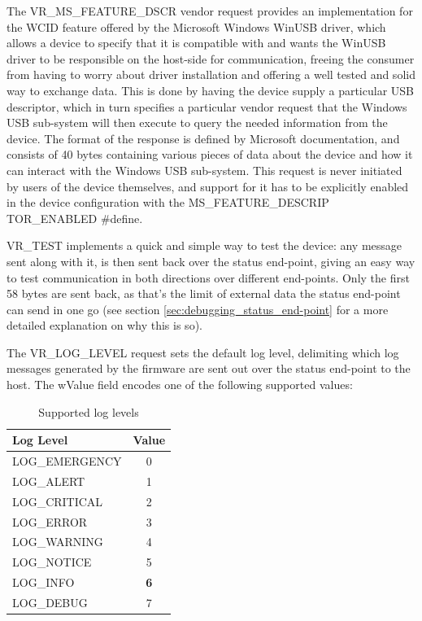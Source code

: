 \documentclass[a4paper,12pt]{report}
\begin{document}
The VR\_MS\_FEATURE\_DSCR vendor request provides an implementation for the WCID feature offered by the Microsoft Windows WinUSB driver, which allows a device to specify that it is compatible with and wants the WinUSB driver to be responsible on the host-side for communication, freeing the consumer from having to worry about driver installation and offering a well tested and solid way to exchange data. This is done by having the device supply a particular USB descriptor, which in turn specifies a particular vendor request that the Windows USB sub-system will then execute to query the needed information from the device. The format of the response is defined by Microsoft documentation, and consists of 40 bytes containing various pieces of data about the device and how it can interact with the Windows USB sub-system. This request is never initiated by users of the device themselves, and support for it has to be explicitly enabled in the device configuration with the MS\_FEATURE\_DESCRIP
 TOR\_ENABLED \#define.

VR\_TEST implements a quick and simple way to test the device: any message sent along with it, is then sent back over the status end-point, giving an easy way to test communication in both directions over different end-points. Only the first 58 bytes are sent back, as that's the limit of external data the status end-point can send in one go (see section \ref{sec:debugging_status_end-point} for a more detailed explanation on why this is so).

The VR\_LOG\_LEVEL request sets the default log level, delimiting which log messages generated by the firmware are sent out over the status end-point to the host. The wValue field encodes one of the following supported values:

\begin{table}[H]
\begin{center}
\caption{Supported log levels}
\label{tab:log_levels}
\begin{tabu} to \linewidth {|l|c|}
\hline
Log Level & Value \\ \hline
LOG\_EMERGENCY & 0 \\ \hline
LOG\_ALERT & 1 \\ \hline
LOG\_CRITICAL & 2 \\ \hline
LOG\_ERROR & 3 \\ \hline
LOG\_WARNING & 4 \\ \hline
LOG\_NOTICE & 5 \\ \hline
LOG\_INFO & \textbf{6} \\ \hline
LOG\_DEBUG & 7 \\ \hline
\end{tabu}
\end{center}
\end{table}
\end{document}
